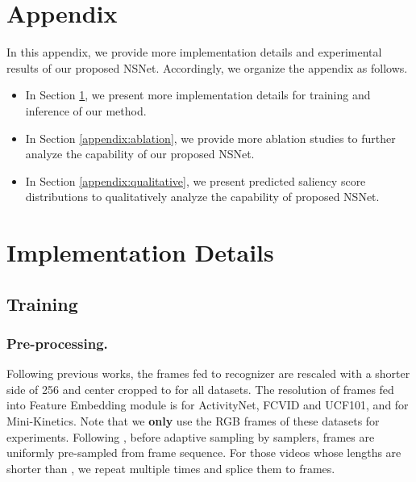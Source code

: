 \documentclass[runningheads]{llncs}
\begin{document}
\clearpage
\appendix
\section*{Appendix} \label{appendix}
\setcounter{table}{0}
In this appendix, we provide more implementation details and experimental results of our proposed NSNet. Accordingly, we organize the appendix as follows.

\begin{itemize}
    \item In Section \ref{appendix:imp}, we present more implementation details for training and inference of our method. 
    \item In Section \ref{appendix:ablation}, we provide more ablation studies to further analyze the capability of our proposed NSNet. 
    \item In Section \ref{appendix:qualitative}, we present predicted saliency score distributions to qualitatively analyze the capability of proposed NSNet.
\end{itemize}

\section{Implementation Details}\label{appendix:imp}
\subsection{Training}\label{appendix:train_details}
\subsubsection{Pre-processing.}
Following previous works, the frames fed to recognizer are rescaled with a shorter side of 256 and center cropped to  for all datasets. The resolution of frames fed into Feature Embedding module is  for ActivityNet, FCVID and UCF101, and  for Mini-Kinetics. Note that we \textbf{only} use the RGB frames of these datasets for experiments.
Following \cite{marl}, before adaptive sampling by samplers,  frames are uniformly pre-sampled from frame sequence. For those videos whose lengths are shorter than , we repeat multiple times and splice them to  frames. 
\end{document}
